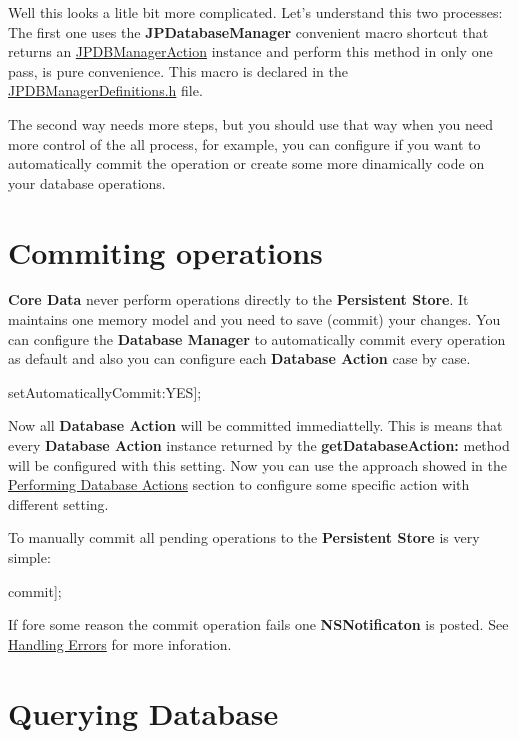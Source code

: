 Well this looks a litle bit more complicated. Let's understand this two processes: The first one uses the {\bfseries JPDatabaseManager} convenient macro shortcut that returns an \hyperlink{interface_j_p_d_b_manager_action}{JPDBManagerAction} instance and perform this method in only one pass, is pure convenience. This macro is declared in the \hyperlink{_j_p_d_b_manager_definitions_8h_source}{JPDBManagerDefinitions.h} file. \par
 \par
 The second way needs more steps, but you should use that way when you need more control of the all process, for example, you can configure if you want to automatically commit the operation or create some more dinamically code on your database operations. \par
 \hypertarget{basic_uses_commit_operation}{}\section{Commiting operations}\label{basic_uses_commit_operation}
{\bfseries Core Data} never perform operations directly to the {\bfseries Persistent Store}. It maintains one memory model and you need to save (commit) your changes. You can configure the {\bfseries Database Manager} to automatically commit every operation as default and also you can configure each {\bfseries Database Action} case by case. 
\begin{DoxyCode}
 [[JPDBManagerSingleton sharedInstance] setAutomaticallyCommit:YES];
\end{DoxyCode}
 Now all {\bfseries Database Action} will be committed immediattelly. This is means that every {\bfseries Database Action} instance returned by the {\bfseries getDatabaseAction:} method will be configured with this setting. Now you can use the approach showed in the \hyperlink{basic_uses_db_action}{Performing Database Actions} section to configure some specific action with different setting.\par
 \par
 To manually commit all pending operations to the {\bfseries Persistent Store} is very simple: 
\begin{DoxyCode}
 [[JPDBManagerSingleton sharedInstance] commit];
\end{DoxyCode}
 If fore some reason the commit operation fails one {\bfseries NSNotificaton} is posted. See \hyperlink{errors}{Handling Errors} for more inforation.\hypertarget{basic_uses_query_operation}{}\section{Querying Database}\label{basic_uses_query_operation}

